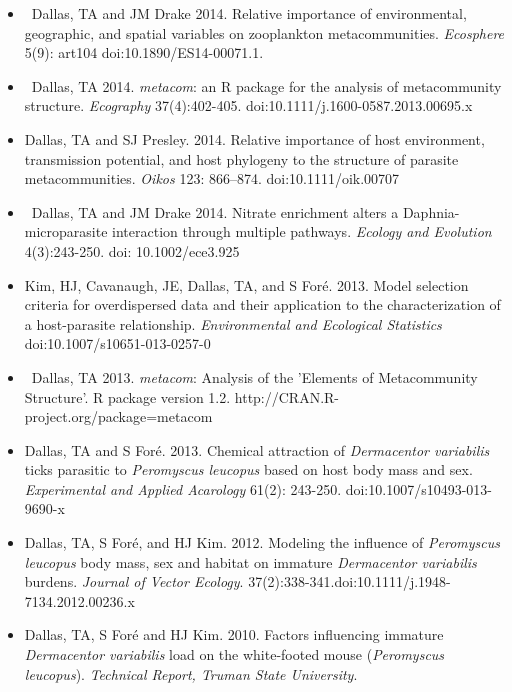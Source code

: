 \documentclass[]{CV}
\begin{document}
\begin{itemize}

\item \OA \ {\mefont Dallas, TA} and JM Drake 2014. Relative importance of environmental, geographic, and spatial variables on zooplankton metacommunities. \textit{Ecosphere} 5(9): art104 doi:10.1890/ES14-00071.1.

\item \OA \ {\mefont Dallas, TA} 2014. \textit{metacom}: an R package for the analysis of metacommunity structure. \textit{Ecography} 37(4):402-405. doi:10.1111/j.1600-0587.2013.00695.x

\item {\mefont Dallas, TA} and SJ Presley. 2014. Relative importance of host environment, transmission potential, and host phylogeny to the structure of parasite metacommunities. \textit{Oikos} 123: 866–874. doi:10.1111/oik.00707

\item \OA \ {\mefont Dallas, TA} and JM Drake 2014. Nitrate enrichment alters a Daphnia-microparasite interaction through multiple pathways. \textit{Ecology and Evolution} 4(3):243-250. doi: 10.1002/ece3.925

\item Kim, HJ, Cavanaugh, JE, {\mefont Dallas, TA}, and S For\'e. 2013. Model selection criteria for overdispersed data and their application to the characterization of a host-parasite relationship. \textit{Environmental and Ecological Statistics} doi:10.1007/s10651-013-0257-0

\item \OA \ {\mefont Dallas, TA} 2013. \textit{metacom}: Analysis of the 'Elements of Metacommunity Structure'. R package version 1.2. http://CRAN.R-project.org/package=metacom

\item {\mefont Dallas, TA} and S For\'e. 2013. Chemical attraction of \textit{Dermacentor variabilis} ticks parasitic to \textit{Peromyscus leucopus} based on host body mass and sex. \textit{Experimental and Applied Acarology} 61(2): 243-250. doi:10.1007/s10493-013-9690-x

\item {\mefont Dallas, TA}, S For\'e,  and  HJ Kim. 2012. Modeling the influence of \textit{Peromyscus leucopus} body mass, sex and habitat on immature \textit{Dermacentor variabilis} burdens. \textit{Journal of Vector Ecology}. 37(2):338-341.doi:10.1111/j.1948-7134.2012.00236.x

\item {\mefont Dallas, TA}, S For\'e and HJ Kim. 2010. Factors influencing immature \textit{Dermacentor variabilis} load on the white-footed mouse (\textit{Peromyscus leucopus}). \textit{Technical Report, Truman State University}.
\end{itemize}
\end{document}
